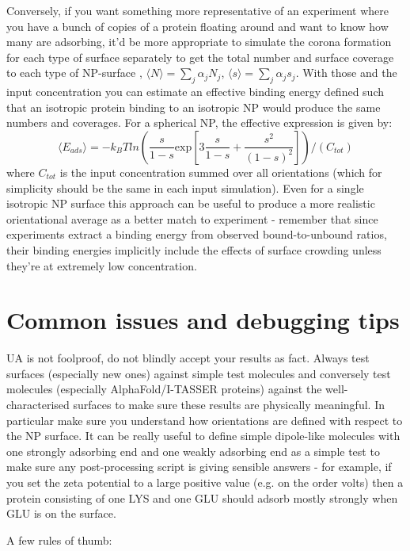 \documentclass[10pt,a4paper,onecolumn]{report}
\begin{document}
Conversely, if you want something more representative of an experiment where you have a bunch of copies of a protein floating around and want to know how many are adsorbing, it'd be more appropriate to simulate the corona formation for each type of surface separately to get the total number and surface coverage to each type of NP-surface , $\langle N \rangle = \sum_j \alpha_j N_j$, $\langle s \rangle = \sum_j \alpha_j s_j$. With those and the input concentration you can estimate an effective binding energy defined such that an isotropic protein binding to an isotropic NP would produce the same numbers and coverages. For a spherical NP, the effective expression is given by:
\begin{equation}
\langle E_{ads} \rangle = -k_BT ln \left( \frac{s}{1-s} \mathrm{exp}[  3 \frac{s}{1-s} +\frac{ s^2}{  (1-s)^2} ]\right)/(C_{tot})
\end{equation}
where $C_{tot}$ is the input concentration summed over all orientations (which for simplicity should be the same in each input simulation). Even for a single isotropic NP surface this approach can be useful to produce a more realistic orientational average as a better match to experiment - remember that since experiments extract a binding energy from observed bound-to-unbound ratios, their binding energies implicitly include the effects of surface crowding unless they're at extremely low concentration.
 
 


\section{Common issues and debugging tips}
UA is not foolproof, do not blindly accept your results as fact. Always test surfaces (especially new ones) against simple test molecules and conversely test molecules (especially AlphaFold/I-TASSER proteins) against the well-characterised surfaces to make sure these results are physically meaningful. In particular make sure you understand how orientations are defined with respect to the NP surface. It can be really useful to define simple dipole-like molecules with one strongly adsorbing end and one weakly adsorbing end as a simple test to make sure any post-processing script is giving sensible answers - for example, if you set the zeta potential to a large positive value (e.g. on the order volts) then a protein consisting of one LYS and one GLU should adsorb mostly strongly when GLU is on the surface.

A few rules of thumb:
\end{document}

